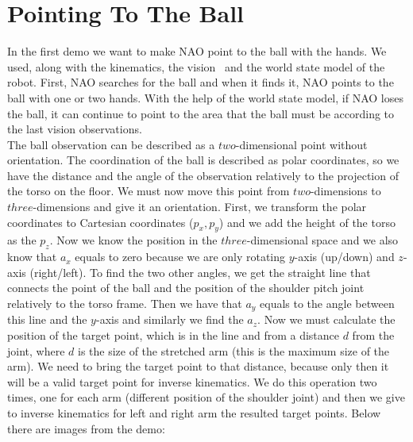 \section{Pointing To The Ball}
In the first demo we want to make NAO point to the ball with the hands. We used, along with the kinematics, the vision~\cite{orfanoudakis2011} and the world state model of the robot. First, NAO searches for the ball and when it finds it, NAO points to the ball with one or two hands. With the help of the world state model, if NAO loses the ball, it can continue to point to the area that the ball must be according to the last vision observations.\\
The ball observation can be described as a \(two\)-dimensional point without orientation. The coordination of the ball is described as polar coordinates, so we have the distance and the angle of the observation relatively to the projection of the torso on the floor. We must now move this point from \(two\)-dimensions to \(three\)-dimensions and give it an orientation. First, we transform the polar coordinates to Cartesian coordinates ($ p_x,p_y $) and we add the height of the torso as the \(p_z\). Now we know the position in the \(three\)-dimensional space and we also know that \(a_x\) equals to zero because we are only rotating \(y\)-axis (up/down) and \(z\)-axis (right/left). To find the two other angles, we get the straight line that connects the point of the ball and the position of the shoulder pitch joint relatively to the torso frame. Then we have that \(a_y\) equals to the angle between this line and the \(y\)-axis and similarly we find the \(a_z\). Now we must calculate the position of the target point, which is in the line and from a distance \(d\) from the joint, where \(d\) is the size of the stretched arm (this is the maximum size of the arm). We need to bring the target point to that distance, because only then it will be a valid target point for inverse kinematics. We do this operation two times, one for each arm (different position of the shoulder joint) and then we give to inverse kinematics for left and right arm the resulted target points. Below there are images from the demo:
